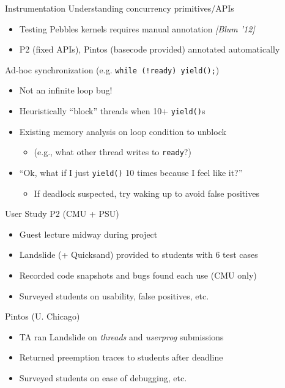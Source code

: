 \documentclass[xcolor=dvipsnames]{beamer}
\begin{document}
\begin{frame}{Instrumentation}
	Understanding concurrency primitives/APIs
	\begin{itemize}
		\item Testing Pebbles kernels requires manual annotation {\em [Blum '12]}
		\item P2 (fixed APIs), Pintos (basecode provided) annotated automatically
	\end{itemize}
	\pause
	\linegap

	Ad-hoc synchronization (e.g. {\tt while (!ready) yield();})
	\begin{itemize}
		\item Not an infinite loop bug!
		\item Heuristically ``block'' threads when 10+ {\tt yield()}s %
		\item Existing memory analysis %
			on loop condition to unblock
			\begin{itemize}
				\item (e.g., what other thread writes to {\tt ready}?)
			\end{itemize}
			\pause
		\item ``Ok, what if I just {\tt yield()} 10 times because I feel like it?''
			\begin{itemize}
				\item If deadlock suspected, try waking up to avoid false positives
			\end{itemize}
	\end{itemize}

\end{frame}

\begin{frame}{User Study}
	P2 (CMU + PSU)
	\begin{itemize}
		\item Guest lecture midway during project
		\item Landslide (+ Quicksand) provided to students with 6 test cases %
		\item Recorded code snapshots and bugs found each use (CMU only)
		\item Surveyed students on usability, false positives, etc.
	\end{itemize}
	\pause
	\linegap

	Pintos (U. Chicago)
	\begin{itemize}
		\item TA %
			ran Landslide on {\em threads} and {\em userprog} submissions
		\item Returned preemption traces to students after deadline
		\item Surveyed students on ease of debugging, etc.
	\end{itemize}
\end{frame}
\end{document}

